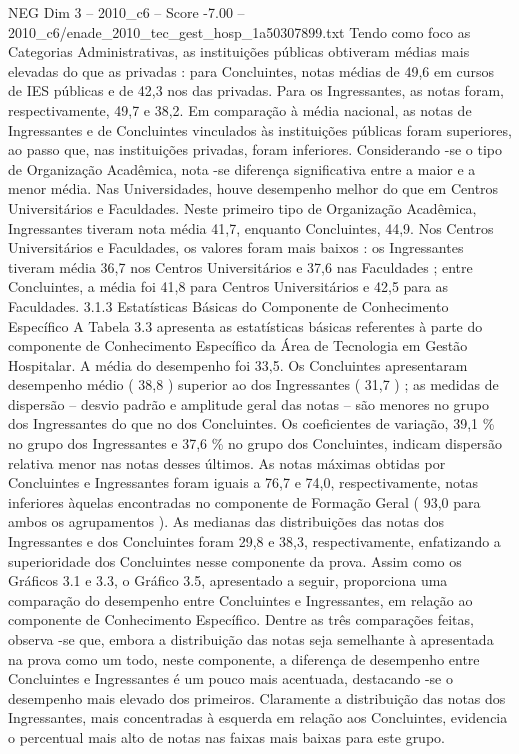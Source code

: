 \begin{textsample}{NEG Dim 3 – 2010\_c6 – Score -7.00 – 2010\_c6/enade\_2010\_tec\_gest\_hosp\_1a50307899.txt}
Tendo como foco as Categorias Administrativas, as instituições públicas obtiveram médias mais elevadas do que as privadas : para Concluintes, notas médias de 49,6 em cursos de IES públicas e de 42,3 nos das privadas.
Para os Ingressantes, as notas foram, respectivamente, 49,7 e 38,2.
Em comparação à média nacional, as notas de Ingressantes e de Concluintes vinculados às instituições públicas foram superiores, ao passo que, nas instituições privadas, foram inferiores.
Considerando -se o tipo de Organização Acadêmica, nota -se diferença significativa entre a maior e a menor média.
Nas Universidades, houve desempenho melhor do que em Centros Universitários e Faculdades.
Neste primeiro tipo de Organização Acadêmica, Ingressantes tiveram nota média 41,7, enquanto Concluintes, 44,9.
Nos Centros Universitários e Faculdades, os valores foram mais baixos : os Ingressantes tiveram média 36,7 nos Centros Universitários e 37,6 nas Faculdades ; entre Concluintes, a média foi 41,8 para Centros Universitários e 42,5 para as Faculdades. 3.1.3 Estatísticas Básicas do Componente de Conhecimento Específico A Tabela 3.3 apresenta as estatísticas básicas referentes à parte do componente de Conhecimento Específico da Área de Tecnologia em Gestão Hospitalar.
A média do desempenho foi 33,5.
Os Concluintes apresentaram desempenho médio ( 38,8 ) superior ao dos Ingressantes ( 31,7 ) ; as medidas de dispersão – desvio padrão e amplitude geral das notas – são menores no grupo dos Ingressantes do que no dos Concluintes.
Os coeficientes de variação, 39,1 \% no grupo dos Ingressantes e 37,6 \% no grupo dos Concluintes, indicam dispersão relativa menor nas notas desses últimos.
As notas máximas obtidas por Concluintes e Ingressantes foram iguais a 76,7 e 74,0, respectivamente, notas inferiores àquelas encontradas no componente de Formação Geral ( 93,0 para ambos os agrupamentos ).
As medianas das distribuições das notas dos Ingressantes e dos Concluintes foram 29,8 e 38,3, respectivamente, enfatizando a superioridade dos Concluintes nesse componente da prova.
Assim como os Gráficos 3.1 e 3.3, o Gráfico 3.5, apresentado a seguir, proporciona uma comparação do desempenho entre Concluintes e Ingressantes, em relação ao componente de Conhecimento Específico.
Dentre as três comparações feitas, observa -se que, embora a distribuição das notas seja semelhante à apresentada na prova como um todo, neste componente, a diferença de desempenho entre Concluintes e Ingressantes é um pouco mais acentuada, destacando -se o desempenho mais elevado dos primeiros.
Claramente a distribuição das notas dos Ingressantes, mais concentradas à esquerda em relação aos Concluintes, evidencia o percentual mais alto de notas nas faixas mais baixas para este grupo.

\end{textsample}
